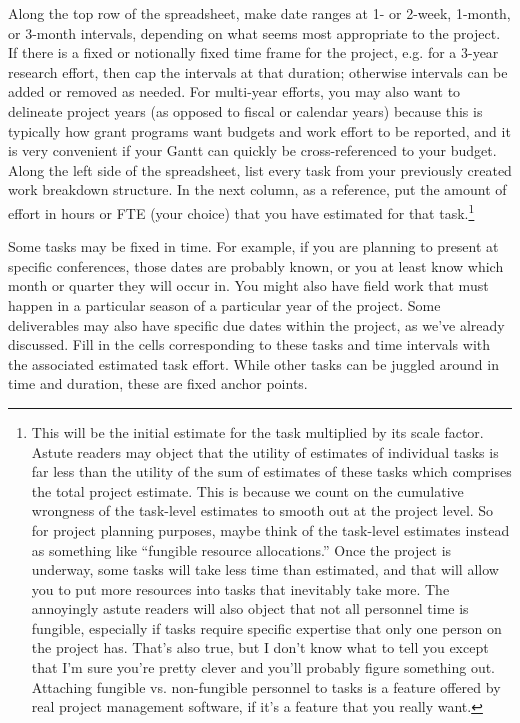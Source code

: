 \documentclass[12pt,oneside]{book}
\begin{document}
Along the top row of the spreadsheet, make date ranges at 1- or 2-week, 1-month, or 3-month intervals, depending on what seems most appropriate to the project. If there is a fixed or notionally fixed time frame for the project, e.g. for a 3-year research effort, then cap the intervals at that duration; otherwise intervals can be added or removed as needed. For multi-year efforts, you may also want to delineate project years (as opposed to fiscal or calendar years) because this is typically how grant programs want budgets and work effort to be reported, and it is very convenient if your Gantt can quickly be cross-referenced to your budget. Along the left side of the spreadsheet, list every task from your previously created work breakdown structure. In the next column, as a reference, put the amount of effort in hours or FTE (your choice) that you have estimated for that task.\footnote{This will be the initial estimate for the task multiplied by its scale factor. Astute readers may object that the utility of estimates of individual tasks is far less than the utility of the sum of estimates of these tasks which comprises the total project estimate. This is because we count on the cumulative wrongness of the task-level estimates to smooth out at the project level. So for project planning purposes, maybe think of the task-level estimates instead as something like ``fungible resource allocations.'' Once the project is underway, some tasks will take less time than estimated, and that will allow you to put more resources into tasks that inevitably take more. The annoyingly astute readers will also object that not all personnel time is fungible, especially if tasks require specific expertise that only one person on the project has. That's also true, but I don't know what to tell you except that I'm sure you're pretty clever and you'll probably figure something out. Attaching fungible vs. non-fungible personnel to tasks is a feature offered by real project management software, if it's a feature that you really want.}

Some tasks may be fixed in time. For example, if you are planning to present at specific conferences, those dates are probably known, or you at least know which month or quarter they will occur in. You might also have field work that must happen in a particular season of a particular year of the project. Some deliverables may also have specific due dates within the project, as we've already discussed. Fill in the cells corresponding to these tasks and time intervals with the associated estimated task effort. While other tasks can be juggled around in time and duration, these are fixed anchor points.
	
\end{document}
